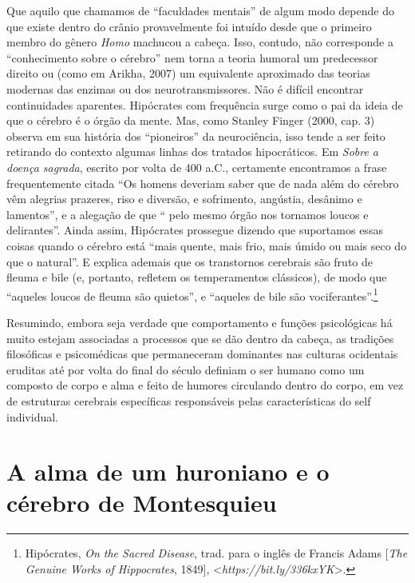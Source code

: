 Que aquilo que chamamos de ``faculdades mentais'' de algum modo depende
do que existe dentro do crânio provavelmente foi intuído desde que o
primeiro membro do gênero \emph{Homo} machucou a cabeça. Isso, contudo,
não corresponde a ``conhecimento sobre o cérebro'' nem torna a teoria
humoral um predecessor direito ou (como em Arikha, 2007) um equivalente
aproximado das teorias modernas das enzimas ou dos neurotransmissores.
Não é difícil encontrar continuidades aparentes. Hipócrates com
frequência surge como o pai da ideia de que o cérebro é o órgão da
mente. Mas, como Stanley Finger (2000, cap. 3) observa em sua história
dos ``pioneiros'' da neurociência, isso tende a ser feito retirando do
contexto algumas linhas dos tratados hipocráticos. Em \emph{Sobre a
doença sagrada}, escrito por volta de 400 a.C., certamente encontramos a
frase frequentemente citada ``Os homens deveriam saber que de nada além
do cérebro vêm alegrias prazeres, riso e diversão, e sofrimento,
angústia, desânimo e lamentos'', e a alegação de que `` pelo mesmo órgão
nos tornamos loucos e delirantes''. Ainda assim, Hipócrates prossegue
dizendo que suportamos essas coisas quando o cérebro está ``mais quente,
mais frio, mais úmido ou mais seco do que o natural''. E explica ademais
que os transtornos cerebrais são fruto de fleuma e bile (e, portanto,
refletem os temperamentos clássicos), de modo que ``aqueles loucos de
fleuma são quietos'', e ``aqueles de bile são
vociferantes''.\footnote[8]{Hipócrates, \emph{On the Sacred Disease}, trad. para o inglês de
Francis Adams {[}\emph{The Genuine Works of Hippocrates}, 1849{]},
\textless{}\emph{https://bit.ly/336kxYK}\textgreater{}.}

Resumindo, embora seja verdade que comportamento e funções psicológicas
há muito estejam associadas a processos que se dão dentro da cabeça, as
tradições filosóficas e psicomédicas que permaneceram dominantes nas
culturas ocidentais eruditas até por volta do final do século 
definiam o ser humano como um composto de corpo e alma e feito de
humores circulando dentro do corpo, em vez de estruturas cerebrais
específicas responsáveis pelas características do self individual.

\section{A alma de um huroniano e o cérebro de Montesquieu}

